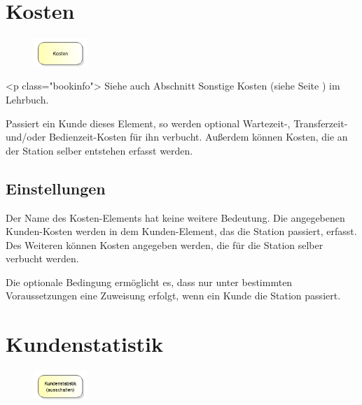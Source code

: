 \section{Kosten}
\label{ref:ModelElementCosts}

\begin{figure}
\vspace{-22pt}
\includegraphics[width=2cm]{imageModelElementCosts.png}
\vspace{-22pt}
\end{figure}

<p class="bookinfo">
Siehe auch Abschnitt Sonstige Kosten (siehe Seite \pageref{ref:book:8.7.4}) im Lehrbuch.

Passiert ein Kunde dieses Element, so werden optional Wartezeit-, Transferzeit- und/oder Bedienzeit-Kosten für ihn
verbucht. Außerdem können Kosten, die an der Station selber entstehen erfasst werden.

\subsection*{Einstellungen}

Der Name des Kosten-Elements hat keine weitere Bedeutung. Die angegebenen Kunden-Kosten werden in dem Kunden-Element,
das die Station passiert, erfasst. Des Weiteren können Kosten angegeben werden, die für die Station selber verbucht
werden.

Die optionale Bedingung ermöglicht es, dass nur unter bestimmten Voraussetzungen eine Zuweisung erfolgt,
wenn ein Kunde die Station passiert.


\section{Kundenstatistik}
\label{ref:ModelElementSetStatisticsMode}

\begin{figure}
\vspace{-22pt}
\includegraphics[width=2cm]{imageModelElementSetStatisticsMode.png}
\vspace{-22pt}
\end{figure}

